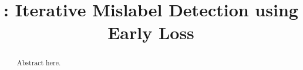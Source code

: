 \documentclass[sigconf, anonymous]{acmart}
\begin{document}
\title{\sys: Iterative Mislabel Detection using Early Loss}

\renewcommand{\shortauthors}{Trovato et al.}

\begin{abstract}
Abstract here.
\end{abstract}

\maketitle











\normalem


\end{document}

